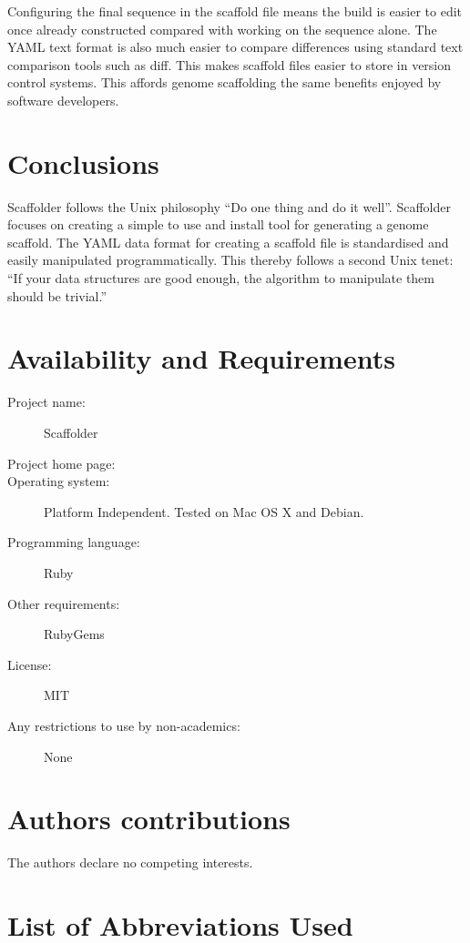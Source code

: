 \documentclass[10pt]{bmc_article}
\newenvironment{bmcformat}{\begin{raggedright}\baselineskip20pt\sloppy\setboolean{publ}{false}}{\end{raggedright}\baselineskip20pt\sloppy}
\begin{document}
\begin{bmcformat}
Configuring the final sequence in the scaffold file means the build is easier
to edit once already constructed compared with working on the sequence alone.
The YAML text format is also much easier to compare differences using standard
text comparison tools such as diff. This makes scaffold files easier to store
in version control systems. This affords genome scaffolding the same benefits
enjoyed by software developers. \pb

\section*{Conclusions} %

Scaffolder follows the Unix philosophy ``Do one thing and do it well''.
Scaffolder focuses on creating a simple to use and install tool for generating
a genome scaffold. The YAML data format for creating a scaffold file is
standardised and easily manipulated programmatically. This thereby follows
a second Unix tenet: ``If your data structures are good enough, the algorithm
to manipulate them should be trivial.''

\section*{Availability and Requirements} %

  \begin{description}
    \item[Project name:] Scaffolder
    \item[Project home page:] \scaffolder
    \item[Operating system:] Platform Independent. Tested on Mac OS X and
    Debian.
    \item[Programming language:] Ruby
    \item[Other requirements:] RubyGems
    \item[License:] MIT
    \item[Any restrictions to use by non-academics:] None
  \end{description}

\section*{Authors contributions} %
  The authors declare no competing interests.

\section*{List of Abbreviations Used} %


\end{bmcformat}
\end{document}
